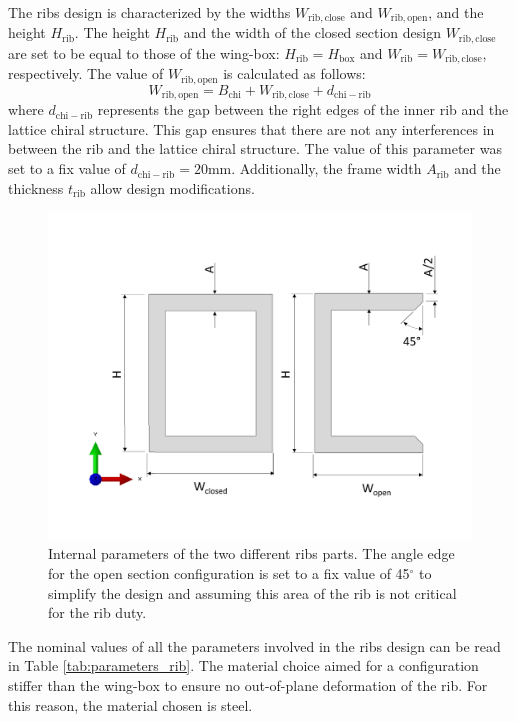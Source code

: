     The ribs design is characterized by the widths $W_{\mathrm{rib,close}}$ and $W_{\mathrm{rib,open}}$, and the height $H_{\mathrm{rib}}$. The height $H_{\mathrm{rib}}$ and the width of the closed section design $W_{\mathrm{rib,close}}$ are set to be equal to those of the wing-box: $H_{\mathrm{rib}} = H_{\mathrm{box}}$ and $W_{\mathrm{rib}} = W_{\mathrm{rib,close}}$, respectively. The value of $W_{\mathrm{rib,open}}$ is calculated as follows:
    \begin{equation*}
    W_{\mathrm{rib,open}} = B_{\mathrm{chi}} + W_{\mathrm{rib,close}} + d_{\mathrm{chi-rib}}
    \end{equation*}
    where $d_{\mathrm{chi-rib}}$ represents the gap between the right edges of the inner rib and the lattice chiral structure. This gap ensures that there are not any interferences in between the rib and the lattice chiral structure. The value of this parameter was set to a fix value of $d_{\mathrm{chi-rib}} = 20$mm. Additionally, the frame width $A_{\mathrm{rib}}$ and the thickness $t_{\mathrm{rib}}$ allow design modifications.

    \begin{figure}[!htpb]
      \centering
      \includegraphics[width=0.8 \textwidth]{figures/model/rib-internalParameters}
      \caption[Internal parameters of the two different ribs parts]{Internal parameters of the two different ribs parts. The angle edge for the open section configuration is set to a fix value of 45$^{\circ}$ to simplify the design and assuming this area of the rib is not critical for the rib duty. }\label{fig:rib-internalParameters}
    \end{figure}

    The nominal values of all the parameters involved in the ribs design can be read in Table \ref{tab:parameters_rib}. The material choice aimed for a configuration stiffer than the wing-box to ensure no out-of-plane deformation of the rib. For this reason, the material chosen is steel.


